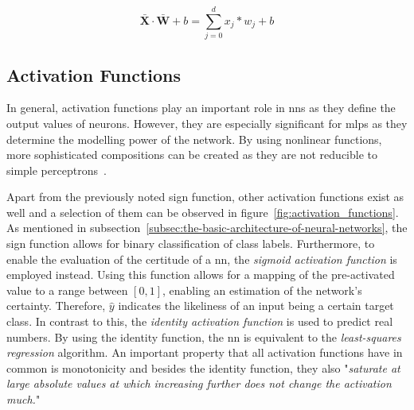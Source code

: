 \documentclass[draft,final]{vutinfth} %
\newcommand{\p}[1]{see p. #1}
\begin{document}
    \begin{equation}
        \bar{\boldsymbol{X}}\cdot\bar{\boldsymbol{W}} + b=\sum_{j=0}^{d}x_j*w_j + b\label{eq:linear_function_equation}
    \end{equation}

    \subsection{Activation Functions}
    In general, activation functions play an important role in \glspl{nn} as they define the output values of neurons.
    However, they are especially significant for \glspl{mlp} as they determine the modelling power of the network.
    By using nonlinear functions, more sophisticated compositions can be created as they are not reducible to simple perceptrons~\citep[\p{13}]{aggarwal_neural_2018}.

    Apart from the previously noted sign function, other activation functions exist as well and a selection of them can be observed in figure~\ref{fig:activation_functions}.
    As mentioned in subsection~\ref{subsec:the-basic-architecture-of-neural-networks}, the sign function allows for binary classification of class labels.
    Furthermore, to enable the evaluation of the certitude of a \gls{nn}, the \textit{sigmoid activation function} is employed instead.
    Using this function allows for a mapping of the pre-activated value to a range between $[0,1]$, enabling an estimation of the network's certainty.
    Therefore, $\hat{y}$ indicates the likeliness of an input being a certain target class.
    In contrast to this, the \textit{identity activation function} is used to predict real numbers.
    By using the identity function, the \gls{nn} is equivalent to the \textit{least-squares regression} algorithm.
    An important property that all activation functions have in common is monotonicity and besides the identity function, they also "\textit{saturate at large absolute values at which increasing further does not change the activation much.}"\citep[\p{13}]{aggarwal_neural_2018}
\end{document}

